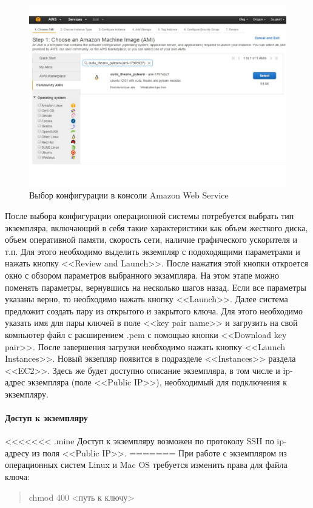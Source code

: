 \documentclass[12pt,twoside]{article}
\begin{document}
\begin{figure}[tb!]
  \centering
      \includegraphics[totalheight=8cm]{ami.pdf}
  \caption{Выбор конфигурации в консоли Amazon Web Service}
  \label{fig:ami}
\end{figure}

После выбора конфигурации операционной системы потребуется выбрать тип экземпляра, включающий в себя такие характеристики как объем жесткого диска, объем оперативной памяти, скорость сети, наличие графического ускорителя и т.п. Для этого необходимо выделить экземпляр с подоходящими параметрами и нажать кнопку <<Review and Launch>>. После нажатия этой кнопки откроется окно с обзором параметров выбранного экзампляра. На этом этапе можно поменять параметры, вернувшись на несколько шагов назад. Если все параметры указаны верно, то необходимо нажать кнопку <<Launch>>. Далее система предложит создать пару из открытого и закрытого ключа. Для этого необходимо указать имя для пары ключей в поле <<key pair name>> и загрузить на свой компьютер файл с расширением .pem с помощью кнопки <<Download key pair>>. После завершения загрузки необходимо нажать кнопку <<Launch Instances>>. Новый экзепляр появится в подразделе <<Instances>> раздела <<EC2>>. Здесь же будет доступно описание экземпляра, в том числе и ip-адрес экземпляра (поле <<Public IP>>), необходимый для подключения к экземпляру.


\paragraph{Доступ к экземпляру}
<<<<<<< .mine
Доступ к экземпляру возможен по протоколу SSH по ip-адресу из поля <<Public IP>>.
=======
При работе с экземпляром из операционных систем Linux и Mac OS требуется изменить права для файла ключа:
\begin{quote}
chmod 400 <путь к ключу>
\end{quote}
\end{document}
